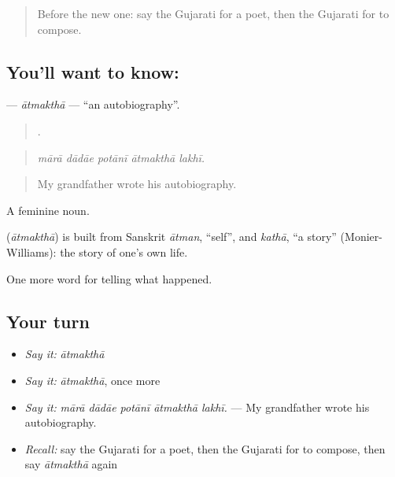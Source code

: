 \label{lesson:GU-C336-atmaktha}



\begin{quote}
Before the new one: say the Gujarati for a poet, then the Gujarati for to compose.
\end{quote}

\subsection*{You'll want to know: }
\textbf{} — \emph{ātmakthā} — \textquotedblleft{}an autobiography\textquotedblright{}.

\begin{quote}
    .
\end{quote}

\begin{quote}
\emph{mārā dādāe potānī ātmakthā lakhī.}
\end{quote}

\begin{quote}
My grandfather wrote his autobiography.
\end{quote}

A feminine noun.

\begin{cousinweb}
\textbf{} (\emph{ātmakthā}) is built from Sanskrit \emph{ātman}, \textquotedblleft{}self\textquotedblright{}, and \emph{kathā}, \textquotedblleft{}a story\textquotedblright{} (Monier-Williams): the story of one's own life.
\end{cousinweb}

\begin{grammarlens}[title={What you've built}]
One more word for telling what happened.
\end{grammarlens}

\subsection*{Your turn}
\begin{itemize}
\raggedright
  \item \emph{Say it:} \emph{ātmakthā}
  \item \emph{Say it:} \emph{ātmakthā}, once more
  \item \emph{Say it:} \emph{mārā dādāe potānī ātmakthā lakhī.} — My grandfather wrote his autobiography.
  \item \emph{Recall:} say the Gujarati for a poet, then the Gujarati for to compose, then say \emph{ātmakthā} again
\end{itemize}

